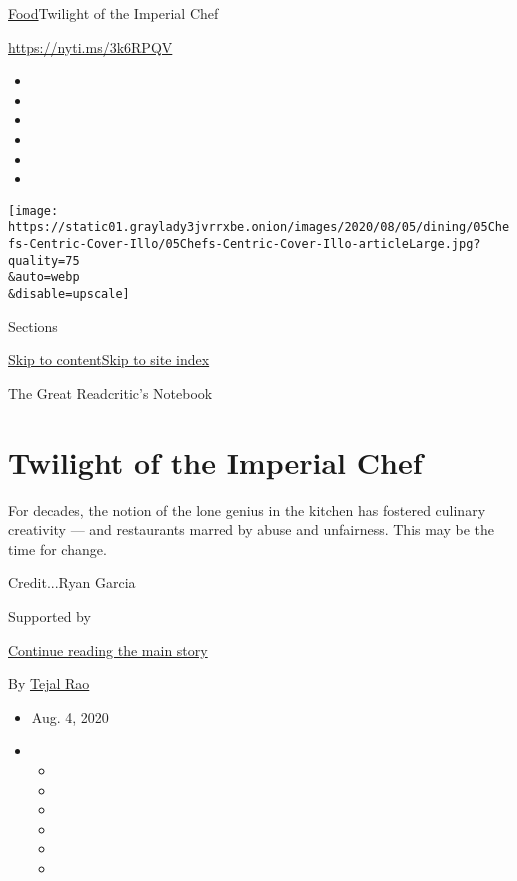 \href{/section/food}{Food}\textbar{}Twilight of the Imperial Chef

\url{https://nyti.ms/3k6RPQV}

\begin{itemize}
\item
\item
\item
\item
\item
\item
\end{itemize}

\texttt{[image: https://static01.graylady3jvrrxbe.onion/images/2020/08/05/dining/05Chefs-Centric-Cover-Illo/05Chefs-Centric-Cover-Illo-articleLarge.jpg?quality=75\\\&auto=webp\\\&disable=upscale]}

Sections

\protect\hyperlink{site-content}{Skip to
content}\protect\hyperlink{site-index}{Skip to site index}

The Great Readcritic's Notebook

\hypertarget{twilight-of-the-imperial-chef}{%
\section{Twilight of the Imperial
Chef}\label{twilight-of-the-imperial-chef}}

For decades, the notion of the lone genius in the kitchen has fostered
culinary creativity --- and restaurants marred by abuse and unfairness.
This may be the time for change.

Credit...Ryan Garcia

Supported by

\protect\hyperlink{after-sponsor}{Continue reading the main story}

By \href{https://www.nytimes3xbfgragh.onion/by/tejal-rao}{Tejal Rao}

\begin{itemize}
\item
  Aug. 4, 2020
\item
  \begin{itemize}
  \item
  \item
  \item
  \item
  \item
  \item
  \end{itemize}
\end{itemize}

